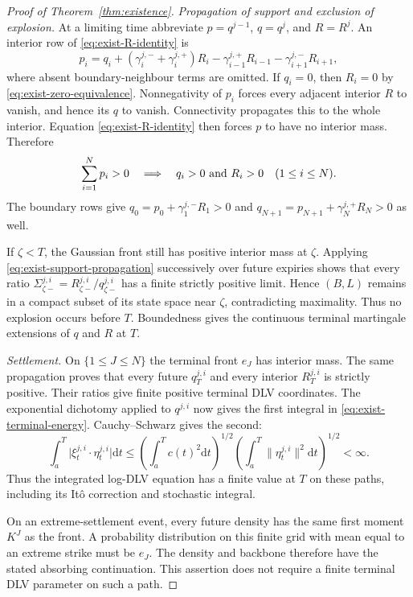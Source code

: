 \documentclass[11pt]{article}
\newcommand{\dd}{\mathrm d}
\newcommand{\abs}[1]{\lvert #1\rvert}
\theoremstyle{plain}
\theoremstyle{definition}
\theoremstyle{remark}
\begin{document}
\begin{proof}[Proof of Theorem~\ref{thm:existence}]
\emph{Propagation of support and exclusion of explosion.}
At a limiting time abbreviate $p=q^{j-1}$, $q=q^j$, and $R=R^j$.
An interior row of \eqref{eq:exist-R-identity} is
\begin{equation}\label{eq:exist-support-row}
 p_i=q_i+(\gamma_i^{j,-}+\gamma_i^{j,+})R_i
       -\gamma_{i-1}^{j,+}R_{i-1}-\gamma_{i+1}^{j,-}R_{i+1},
\end{equation}
where absent boundary-neighbour terms are omitted. If $q_i=0$, then
$R_i=0$ by \eqref{eq:exist-zero-equivalence}. Nonnegativity of $p_i$
forces every adjacent interior $R$ to vanish, and hence its $q$ to
vanish. Connectivity propagates this to the whole interior. Equation
\eqref{eq:exist-R-identity} then forces $p$ to have no interior mass.
Therefore
\begin{equation}\label{eq:exist-support-propagation}
 \sum_{i=1}^N p_i>0
 \quad\Longrightarrow\quad q_i>0\ \hbox{and}\ R_i>0
 \quad(1\le i\le N).
\end{equation}
The boundary rows give $q_0=p_0+\gamma_1^{j,-}R_1>0$ and
$q_{N+1}=p_{N+1}+\gamma_N^{j,+}R_N>0$ as well.

If $\zeta<T$, the Gaussian front still has positive interior mass at
$\zeta$. Applying \eqref{eq:exist-support-propagation} successively
over future expiries shows that every ratio
$\Sigma^{j,i}_{\zeta-}=R^{j,i}_{\zeta-}/q^{j,i}_{\zeta-}$ has a finite
strictly positive limit. Hence $(B,L)$ remains in a compact subset of
its state space near $\zeta$, contradicting maximality. Thus no
explosion occurs before $T$. Boundedness gives the continuous terminal
martingale extensions of $q$ and $R$ at $T$.

\emph{Settlement.}
On $\{1\le J\le N\}$ the terminal front $e_J$ has interior mass.
The same propagation proves that every future $q_T^{j,i}$ and every
interior $R_T^{j,i}$ is strictly positive. Their ratios give finite
positive terminal DLV coordinates. The exponential dichotomy applied
to $q^{j,i}$ now gives the first integral in
\eqref{eq:exist-terminal-energy}. Cauchy--Schwarz gives the second:
\[
 \int_a^T\abs{\xi_t^{j,i}\cdot\eta_t^{j,i}}\dd t
 \le\left(\int_a^T c(t)^2\dd t\right)^{1/2}
     \left(\int_a^T\lVert\eta_t^{j,i}\rVert^2\dd t\right)^{1/2}<\infty.
\]
Thus the integrated log-DLV equation has a finite value at $T$ on
these paths, including its It\^o correction and stochastic integral.

On an extreme-settlement event, every future density has the same
first moment $K^J$ as the front. A probability distribution on this
finite grid with mean equal to an extreme strike must be $e_J$.
The density and backbone therefore have the stated absorbing
continuation. This assertion does not require a finite terminal DLV
parameter on such a path.
\end{proof}
\end{document}
